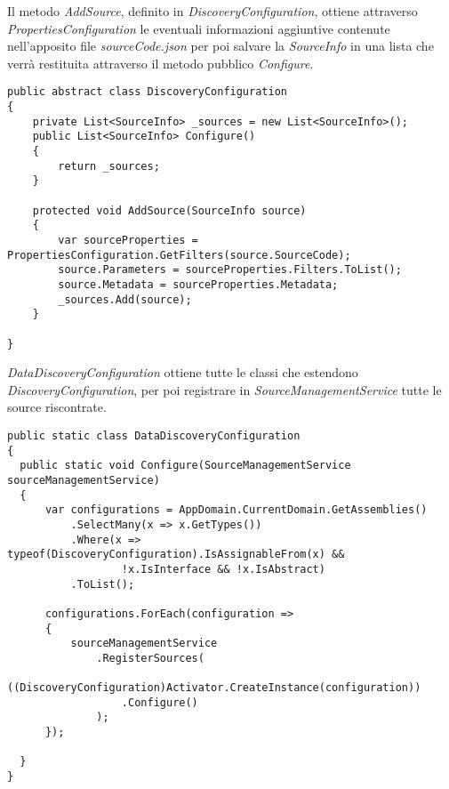 Il metodo \textit{AddSource}, definito in \textit{DiscoveryConfiguration}, ottiene attraverso \textit{PropertiesConfiguration} le eventuali informazioni aggiuntive contenute nell’apposito file \textit{{sourceCode}.json} per poi salvare la \textit{SourceInfo} in una lista che verrà restituita attraverso il metodo pubblico \textit{Configure}.
\begin{lstlisting}[caption={DiscoveryConfiguration.cs}, style=sharpCode]
public abstract class DiscoveryConfiguration
{
    private List<SourceInfo> _sources = new List<SourceInfo>();
    public List<SourceInfo> Configure()
    {
        return _sources;
    }

    protected void AddSource(SourceInfo source)
    {
        var sourceProperties = PropertiesConfiguration.GetFilters(source.SourceCode);
        source.Parameters = sourceProperties.Filters.ToList();
        source.Metadata = sourceProperties.Metadata;
        _sources.Add(source);
    }

}
\end{lstlisting}
\textit{DataDiscoveryConfiguration} ottiene tutte le classi che estendono \textit{DiscoveryConfiguration}, per poi registrare in \textit{SourceManagementService} tutte le source riscontrate.
\begin{lstlisting}[caption={DataDiscoveryConfiguraton.cs}, style=sharpCode]
public static class DataDiscoveryConfiguration
{
  public static void Configure(SourceManagementService sourceManagementService)
  {
      var configurations = AppDomain.CurrentDomain.GetAssemblies()
          .SelectMany(x => x.GetTypes())
          .Where(x => typeof(DiscoveryConfiguration).IsAssignableFrom(x) && 
                  !x.IsInterface && !x.IsAbstract)
          .ToList();

      configurations.ForEach(configuration =>
      {
          sourceManagementService
              .RegisterSources(
                  ((DiscoveryConfiguration)Activator.CreateInstance(configuration))
                  .Configure()
              );
      });

  }
}
\end{lstlisting}
